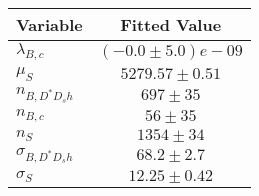 \begin{tabular}[t]{lc}
\hline
Variable &Fitted Value\\
\hline\hline
$\lambda_{B,c}$&$(-0.0\pm5.0)e-09$\\
\hline
$\mu_S$&$5279.57\pm0.51$\\
\hline
$n_{B, D^* D_s h}$&$697\pm35$\\
\hline
$n_{B,c}$&$56\pm35$\\
\hline
$n_S$&$1354\pm34$\\
\hline
$\sigma_{B, D^* D_s h}$&$68.2\pm2.7$\\
\hline
$\sigma_S$&$12.25\pm0.42$\\
\hline
\end{tabular}